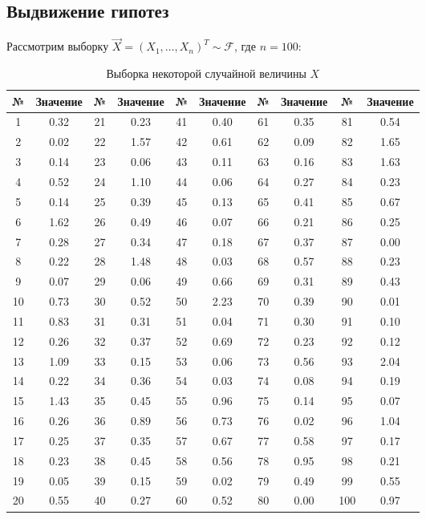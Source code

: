 \subsection{Выдвижение гипотез}

Рассмотрим выборку \( \vec{X}=(X_1,\ldots,X_n)^T\sim\mathcal{F} \), где \( n = 100 \):

\begin{table}[h!]
\centering
\begin{tabular}{|c|c||c|c||c|c||c|c||c|c|}
\hline
№ & Значение & № & Значение & № & Значение & № & Значение & № & Значение \\ \hline \hline
1  & 0.32 & 21 & 0.23 & 41 & 0.40 & 61 & 0.35 & 81 & 0.54 \\ \hline
2  & 0.02 & 22 & 1.57 & 42 & 0.61 & 62 & 0.09 & 82 & 1.65 \\ \hline
3  & 0.14 & 23 & 0.06 & 43 & 0.11 & 63 & 0.16 & 83 & 1.63 \\ \hline
4  & 0.52 & 24 & 1.10 & 44 & 0.06 & 64 & 0.27 & 84 & 0.23 \\ \hline
5  & 0.14 & 25 & 0.39 & 45 & 0.13 & 65 & 0.41 & 85 & 0.67 \\ \hline
6  & 1.62 & 26 & 0.49 & 46 & 0.07 & 66 & 0.21 & 86 & 0.25 \\ \hline
7  & 0.28 & 27 & 0.34 & 47 & 0.18 & 67 & 0.37 & 87 & 0.00 \\ \hline
8  & 0.22 & 28 & 1.48 & 48 & 0.03 & 68 & 0.57 & 88 & 0.23 \\ \hline
9  & 0.07 & 29 & 0.06 & 49 & 0.66 & 69 & 0.31 & 89 & 0.43 \\ \hline
10 & 0.73 & 30 & 0.52 & 50 & 2.23 & 70 & 0.39 & 90 & 0.01 \\ \hline
11 & 0.83 & 31 & 0.31 & 51 & 0.04 & 71 & 0.30 & 91 & 0.10 \\ \hline
12 & 0.26 & 32 & 0.37 & 52 & 0.69 & 72 & 0.23 & 92 & 0.12 \\ \hline
13 & 1.09 & 33 & 0.15 & 53 & 0.06 & 73 & 0.56 & 93 & 2.04 \\ \hline
14 & 0.22 & 34 & 0.36 & 54 & 0.03 & 74 & 0.08 & 94 & 0.19 \\ \hline
15 & 1.43 & 35 & 0.45 & 55 & 0.96 & 75 & 0.14 & 95 & 0.07 \\ \hline
16 & 0.26 & 36 & 0.89 & 56 & 0.73 & 76 & 0.02 & 96 & 1.04 \\ \hline
17 & 0.25 & 37 & 0.35 & 57 & 0.67 & 77 & 0.58 & 97 & 0.17 \\ \hline
18 & 0.23 & 38 & 0.45 & 58 & 0.56 & 78 & 0.95 & 98 & 0.21 \\ \hline
19 & 0.05 & 39 & 0.15 & 59 & 0.02 & 79 & 0.49 & 99 & 0.55 \\ \hline
20 & 0.55 & 40 & 0.27 & 60 & 0.52 & 80 & 0.00 & 100& 0.97 \\ \hline
\end{tabular}
\caption{Выборка некоторой случайной величины \( X \)}
\end{table}

